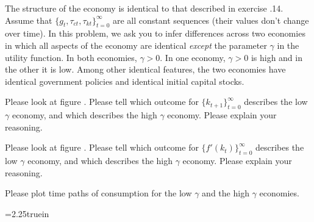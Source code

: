 %

\vfil\eject


\medskip
{}
\medskip
\noindent
 The structure of the  economy is identical to that described in exercise \the\chapternum.14.
Assume that $\{g_t, \tau_{ct}, \tau_{kt}\}_{t=0}^\infty $ are all constant sequences (their values don't change over time).
In this problem, we ask you to infer  differences
across two economies in which all aspects of the economy are identical {\it except} the parameter $\gamma$ in the utility function. In both economies, $\gamma > 0$.  In one economy, $\gamma >0$ is high and in the other it is low.
Among other identical features, the two economies have identical government policies and identical initial capital stocks.\medskip
\medskip

   Please look at figure . Please tell which outcome for $\{k_{t+1}\}_{t=0}^\infty$ describes the low $\gamma$ economy, and which describes the high $\gamma$ economy.
Please explain your reasoning.\medskip

   Please look at figure . Please tell which outcome for $\{f'(k_t)\}_{t=0}^\infty$ describes the low $\gamma$ economy, and which describes the high $\gamma$ economy.
Please explain your reasoning.
\medskip

 Please plot time paths of consumption for the low $\gamma$ and the high $\gamma$ economies.
\medskip
%
%





\medskip



\centerline{\epsfxsize=2.25truein}
\caption{Marginal product of capital as function of time in two economies with different values of $\gamma$.}
\endfigure
\medskip

